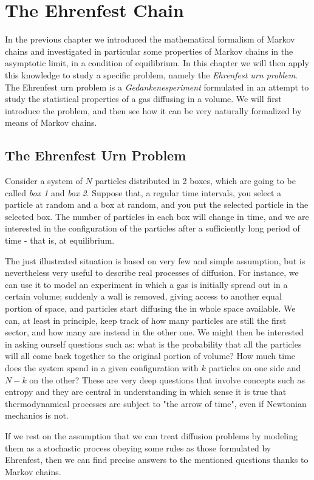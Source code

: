 \chapter{The Ehrenfest Chain}
In the previous chapter we introduced the mathematical formalism of Markov chains and investigated in particular some properties of Markov chains in the asymptotic limit, in a condition of equilibrium. In this chapter we will then apply this knowledge to study a specific problem, namely the \emph{Ehrenfest urn problem}. The Ehrenfest urn problem is a \emph{Gedankenesperiment} formulated in an attempt to study the statistical properties of a gas diffusing in a volume. We will first introduce the problem, and then see how it can be very naturally formalized by means of Markov chains.
\section{The Ehrenfest Urn Problem}
Consider a system of $N$ particles distributed in 2 boxes, which are going to be called \emph{box 1} and \emph{box 2}. Suppose that, a regular time intervals, you select a particle at random and a box at random, and you put the selected particle in the selected box. The number of particles in each box will change in time, and we are interested in the configuration of the particles after a sufficiently long period of time - that is, at equilibrium.

The just illustrated situation is based on very few and simple assumption, but is nevertheless very useful to describe real processes of diffusion. For instance, we can use it to model an experiment in which a gas is initially spread out in a certain volume; suddenly a wall is removed, giving access to another equal portion of space, and particles start diffusing the in whole space available. We can, at least in principle, keep track of how many particles are still the first sector, and how many are instead in the other one. We might then be interested in asking ourself questions such as: what is the probability that all the particles will all come back together to the original portion of volume? How much time does the system spend in a given configuration with $k$ particles on one side and $N - k$ on the other? These are very deep questions that involve concepts such as entropy and they are central in understanding in which sense it is true that thermodynamical processes are subject to "the arrow of time", even if Newtonian mechanics is not. 

If we rest on the assumption that we can treat diffusion problems by modeling them as a stochastic process obeying some rules as those formulated by Ehrenfest, then we can find precise answers to the mentioned questions thanks to Markov chains.
